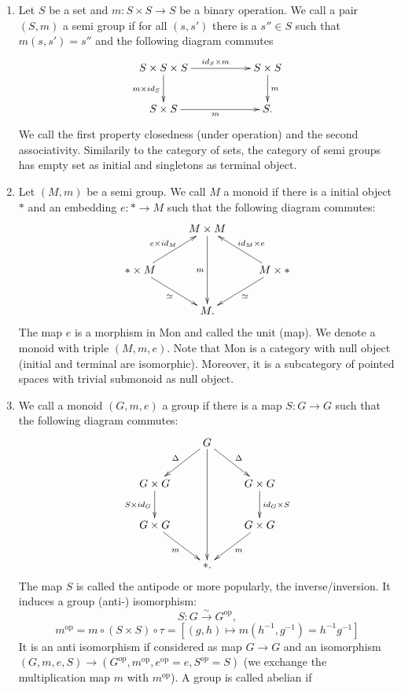 \begin{enumerate}
\item Let $S$ be a set and $m : S \times S \longrightarrow S$ be a binary operation. We call a pair $(S, m)$ a semi group if for all $(s, s')$ there is a $s'' \in S$ such that $m(s,s') = s''$ and the following diagram commutes 
$$\xymatrix{
S \times S \times S \ar[rr]^{id_S \times m}\ar[d]_{m \times id_S} && S \times S\ar[d]^{m}\\
S \times S \ar[rr]_{m} &&S.\\
}$$
We call the first property closedness (under operation) and the second associativity. Similarily to the category of sets, the category of semi groups has empty set as initial and singletons as terminal object.\\
\item Let $(M, m)$ be a semi group. We call $M$ a monoid if there is a initial object $\ast$ and an embedding $e : \ast \longrightarrow M$ such that the following diagram commutes:
$$\xymatrix{
& M \times M \ar[dd]_{m}& \\
\ast \times M \ar[ur]^{e \times id_M}\ar[dr]_{\simeq} && M \times \ast \ar[ul]_{id_M \times e}\ar[dl]^{\simeq} \\
&M.&\\
}$$
The map $e$ is a morphism in $\mathrm{Mon}$ and called the unit (map). We denote a monoid with triple $(M, m, e)$. Note that $\mathrm{Mon}$ is a category with null object (initial and terminal are isomorphic). Moreover, it is a subcategory of pointed spaces with trivial submonoid as null object.
\item We call a monoid $(G, m, e)$ a group if there is a map $S : G \longrightarrow G$ such that the following diagram commutes:
$$\xymatrix{
&G \ar[ld]_{\Delta} \ar[ddd] \ar[dr]^{\Delta}&\\
G \times G \ar[d]_{S \times id_G} & & \ar[d]^{id_G \times S} G \times G\\
G \times G \ar[dr]_{m} & & \ar[dl]^{m} G \times G\\
&\ast.&\\
}$$
The map $S$ is called the antipode or more popularly, the inverse/inversion. It induces a group (anti-) isomorphism:
$$S : G \stackrel{\sim}{\longrightarrow} G^{\mathrm{op}},$$
$$m^{\mathrm{op}} = m \circ (S \times S) \circ \tau = \left[(g, h) \longmapsto m(h^{-1},g^{-1}) = h^{-1} g^{-1}\right]$$
It is an anti isomorphism if considered as map $G \longrightarrow G$ and an isomorphism $(G,m,e,S) \longrightarrow (G^{\mathrm{op}},m^{\mathrm{op}},e^{\mathrm{op}} = e, S^{op} = S)$ (we exchange the multiplication map $m$ with $m^{\mathrm{op}}$). A group is called abelian if

\end{enumerate}
